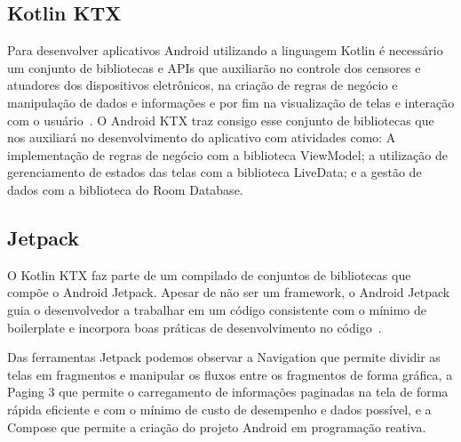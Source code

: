 \subsection{Kotlin KTX}\label{subsec:kotlin-ktx}

Para desenvolver aplicativos Android utilizando a linguagem Kotlin é necessário um conjunto de bibliotecas e APIs que auxiliarão no controle dos censores e atuadores dos dispositivos eletrônicos, na criação de regras de negócio e manipulação de dados e informações e por fim na visualização de telas e interação com o usuário~\cite{jetpack}.
O Android KTX traz consigo esse conjunto de bibliotecas que nos auxiliará no desenvolvimento do aplicativo com atividades como: A implementação de regras de negócio com a biblioteca ViewModel; a utilização de gerenciamento de estados das telas com a biblioteca LiveData; e a gestão de dados com a biblioteca do Room Database.

\subsection{Jetpack}\label{subsec:jetpack}

O Kotlin KTX faz parte de um compilado de conjuntos de bibliotecas que compõe o Android Jetpack.
Apesar de não ser um framework, o Android Jetpack guia o desenvolvedor a trabalhar em um código consistente com o mínimo de boilerplate e incorpora boas práticas de desenvolvimento no código~\cite{ktx}.

Das ferramentas Jetpack podemos observar a Navigation que permite dividir as telas em fragmentos e manipular os fluxos entre os fragmentos de forma gráfica, a Paging 3 que permite o carregamento de informações paginadas na tela de forma rápida eficiente e com o mínimo de custo de desempenho e dados possível, e a Compose que permite a criação do projeto Android em programação reativa.
